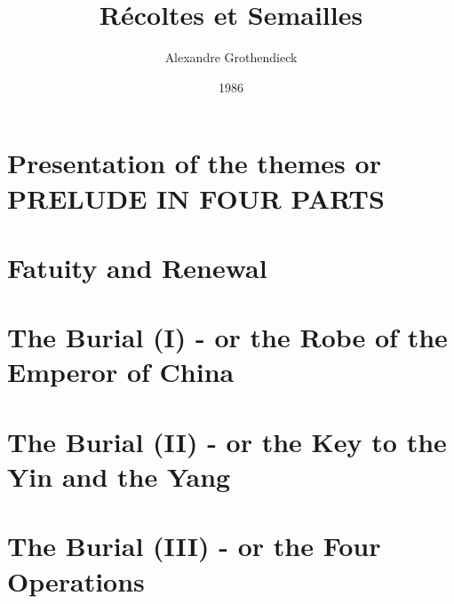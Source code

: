 \documentclass{book}
\begin{document}
\title{R\'ecoltes et Semailles}
\author{Alexandre Grothendieck}
\date{1986}
\maketitle
\tableofcontents


\part*{Presentation of the themes or PRELUDE IN FOUR PARTS}




% 


% 

\part{Fatuity and Renewal}
\label{part:1}

% 
% 
% 
% 
% 
% 
% 
% 

\part{The Burial (I) - or the Robe of the Emperor of China}
\label{part:2}




% 


\part{The Burial (II) - or the Key to the Yin and the Yang}
\label{part:3}


% 

\part{The Burial (III) - or the Four Operations}
\label{part:4}


\end{document}

